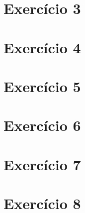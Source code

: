 \documentclass[12pt, a4paper, twoside]{article}
\begin{document}
\section{Exercício 3}


\section{Exercício 4}


\section{Exercício 5}


\section{Exercício 6}


\section{Exercício 7}


\section{Exercício 8}

\end{document}
